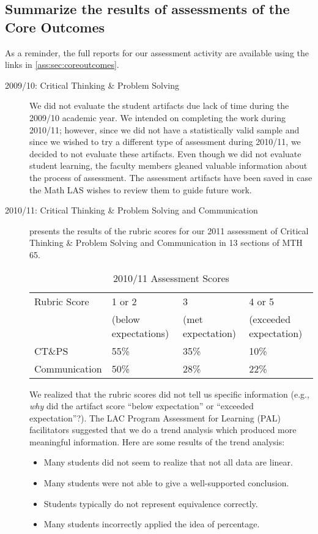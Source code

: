 \subsection{Summarize the results of assessments of the Core Outcomes}
As a reminder, the full reports for our assessment activity are available using
the links in \cref{ass:sec:coreoutcomes}.


\begin{description}
\item[2009/10: Critical Thinking \& Problem Solving]
We did not evaluate the student artifacts due lack of time during the 2009/10
academic year. We intended on completing the work during 2010/11; however, since
we did not have a statistically valid sample and since we wished to try a
different type of assessment during 2010/11, we decided to not evaluate these
artifacts.  Even though we did not evaluate student learning, the faculty
members gleaned valuable information about the process of assessment. The
assessment artifacts have been saved in case the Math LAS wishes to review them
to guide future work.
\item[2010/11:  Critical Thinking \& Problem Solving and Communication]
 presents the results of the rubric scores for our
2011 assessment of Critical Thinking \& Problem Solving and Communication in 13
sections of MTH 65.
\begin{table}[!htb]
\centering
\caption{2010/11 Assessment Scores}\label{ass:tab:201011scores}
\begin{tabular}{llll}
\toprule
Rubric Score & 1 or 2 & 3 & 4 or 5\\
&(below expectations)&(met expectation)&(exceeded expectation)\\
\midrule
CT\&PS &55\%&35\%&10\%\\
Communication &50\%&28\%&22\%\\
\bottomrule
\end{tabular}
\end{table}

We realized that the rubric scores did not tell us specific information (e.g.,
\emph{why} did the artifact score ``below expectation'' or ``exceeded
expectation''?).  The LAC Program Assessment for Learning (PAL) facilitators
suggested that we do a trend analysis which produced more meaningful
information. Here are some results of the trend analysis:
\begin{itemize}
\item Many students did not seem to realize that not all data are linear.
\item Many students were not able to give a well-supported conclusion.
\item Students typically do not represent equivalence correctly.
\item Many students incorrectly applied the idea of percentage.
\end{itemize}


\end{description}
